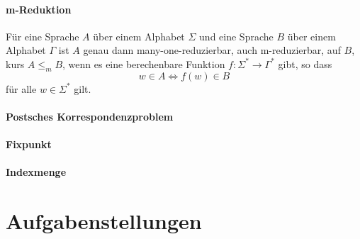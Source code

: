 \documentclass[DIV=15]{scrartcl}
\begin{document}
\subsection{m-Reduktion}
    Für eine Sprache \(A\) über einem Alphabet \(\Sigma\) und eine Sprache \(B\) über einem Alphabet \(\Gamma\)
    ist \(A\) genau dann many-one-reduzierbar, auch m-reduzierbar, auf \(B\), kurs \(A\leq_m B\), wenn es eine berechenbare Funktion 
    \(f:\Sigma^*\to\Gamma^*\) gibt, so dass
    \[w\in A\Leftrightarrow f(w)\in B\]
    für alle \(w\in\Sigma^*\) gilt.
\subsection{Postsches Korrespondenzproblem}
\subsection{Fixpunkt}
\subsection{Indexmenge}
\part{Aufgabenstellungen}
\end{document}
